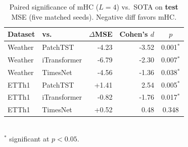 \begin{table}[t]
\centering
\caption{Paired significance of mHC ($L{=}4$) vs.\ SOTA on \textbf{test} MSE (five matched seeds). Negative diff favors mHC.}
\label{tab:sotasig}
\footnotesize
\begin{tabular}{llrrc}
\toprule
Dataset & vs.\ & $\Delta$MSE & Cohen's $d$ & $p$ \\
\midrule
Weather & PatchTST & -4.23 & -3.52 & 0.001$^{*}$ \\
Weather & iTransformer & -6.79 & -2.30 & 0.007$^{*}$ \\
Weather & TimesNet & -4.56 & -1.36 & 0.038$^{*}$ \\
ETTh1 & PatchTST & +1.41 & 2.54 & 0.005$^{*}$ \\
ETTh1 & iTransformer & -0.82 & -1.76 & 0.017$^{*}$ \\
ETTh1 & TimesNet & +0.52 & 0.48 & 0.348 \\
\bottomrule
\end{tabular}
\\[2pt]
\footnotesize $^{*}$ significant at $p<0.05$.
\end{table}
